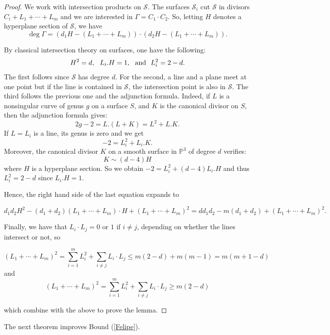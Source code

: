 \documentclass[12pt]{amsart}
\theoremstyle{definition}
\newcommand{\PP}{{\mathbb P}}
\newcommand{\calS}{{\mathcal S}}
\def\PP{\mathbb{P}}
\begin{document}
\begin{proof}
    We work with intersection products on $\calS$. The surfaces $\calS_i$ cut $\calS$ in divisors $C_i +L_1+\cdots+L_m$ and we are interested in $\Gamma = C_1\cdot C_2$. So, letting $H$ denotes a hyperplane section of $\calS$, we have
    $$\deg \Gamma = (d_1H - (L_1+\cdots+L_m))\cdot (d_2H - (L_1+\cdots+L_m)).$$

    By classical intersection theory on surfaces, one have the following: 
    $$H^2 = d,\ \  L_i.H = 1, \ \ {\rm and}\ \   L_i^2 = 2-d.$$
    The first follows since $\calS$ has degree $d$.
    For the second, a line and a plane meet at one point but if the line is contained in $\calS$, the intersection point is also in $\calS$. The third follows the previous one and the adjunction formula. 
 Indeed, if $L$ is a nonsingular curve of genus $g$ on a surface $S$, and $K$ is the canonical divisor on $S$, then the adjunction formula gives:
 $$2g-2=L.(L+K)=L^2+L.K.$$
 If $L=L_i$ is a line, its genus is zero and we get
 $$-2=L_i^2+L_i.K.$$
 Moreover, the canonical divisor $K$ on a smooth surface in $\PP^3$ of degree $d$ verifies:
 $$K\sim (d-4)H$$
 where $H$ is a hyperplane section. So we obtain
 $-2=L_i^2+(d-4)L_i.H$ and thus $L_i^2=2-d$ since $L_i.H=1$.
 
    Hence, the right hand side of the last equation expands to 

    $$d_1d_2H^2 - (d_1+d_2)(L_1+\cdots+L_m)\cdot H + (L_1+\cdots+L_m)^2 = dd_1d_2 -m(d_1+d_2) + (L_1+\cdots+L_m)^2.$$

    Finally, we have that $L_i\cdot L_j = 0$ or $1$ if $i\ne j$, depending on whether the lines intersect or not, so

    $$(L_1+\cdots+L_m)^2 = \sum_{i=1}^m L_i^2 + \sum_{i \ne j} L_i\cdot L_j \le m(2-d)+m(m-1)=m(m+1-d)$$
and
    $$(L_1+\cdots+L_m)^2 = \sum_{i=1}^m L_i^2 + \sum_{i \ne j} L_i\cdot L_j \ge m(2-d)$$
    
    which combine with the above to prove the lemma.
\end{proof}





The next theorem improves Bound (\ref{Felipe}).
\end{document}
